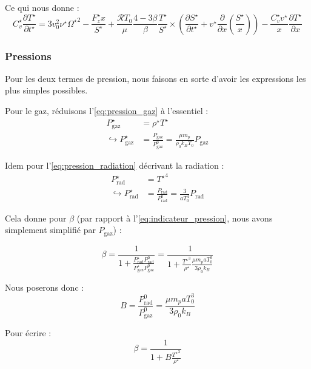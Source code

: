Ce qui nous donne :
\begin{equation}
    C_v^\star \frac{\partial T^{\star}}{\partial t^{\star}} =
    3 v_0^2 \nu^\star {\Omega^\star}^2 - \frac{F_z^\star x}{S^\star} +
    \frac{\mathcal{R} T_0}{\mu} \frac{4-3\beta}{\beta} \frac{T^\star}{S^\star} \times
    \left( \frac{\partial S^\star}{\partial t^\star} + v^\star \frac{\partial}{\partial x} \left(\frac{S^\star}{x}\right) \right) -
    \frac{C_v^\star v^\star}{x} \frac{\partial T^\star}{\partial x}
\end{equation}

\subsubsection{Pressions}

Pour les deux termes de pression, nous faisons en sorte d’avoir les expressions
les plus simples possibles.

Pour le gaz, réduisons l’\cref{eq:pression_gaz} à l’essentiel :
\begin{align}
    P_\mathrm{gaz}^\star &= \rho^\star T^\star \\ 
    \hookrightarrow P_\mathrm{gaz}^\star &= \frac{P_\mathrm{gaz}}{P_\mathrm{gaz}^0} = \frac{\mu m_p}{\rho_0 k_B T_0} P_\mathrm{gaz}
\end{align}

Idem pour l’\cref{eq:pression_radiation} décrivant la radiation :
\begin{align}
    P_\mathrm{rad}^\star &= {T^\star}^4 \\
    \hookrightarrow P_\mathrm{rad}^\star &= \frac{P_\mathrm{rad}}{P_\mathrm{rad}^0} = \frac{3}{a T_0^4} P_\mathrm{rad}
\end{align}

Cela donne pour $\beta$ (par rapport à l’\cref{eq:indicateur_pression}, nous
avons simplement simplifié par $P_\mathrm{gaz}$) :

\begin{equation}
    \beta = \frac{1}{1 + \frac{P_\mathrm{rad}^\star P_\mathrm{rad}^0}{P_\mathrm{gaz}^\star P_\mathrm{gaz}^0}} = \frac{1}{1 + \frac{{T^\star}^3}{\rho^\star} \frac{\mu m_p a T_0^3}{3 \rho_0 k_B}}
\end{equation}

Nous poserons donc :
\begin{equation}
    B = \frac{P_\mathrm{rad}^0}{P_\mathrm{gaz}^0} = \frac{\mu m_p a T_0^3}{3 \rho_0 k_B}
\end{equation}

Pour écrire :
\begin{equation}
    \beta = \frac{1}{1 + B \frac{{T^\star}^3}{\rho^\star}}
\end{equation}

